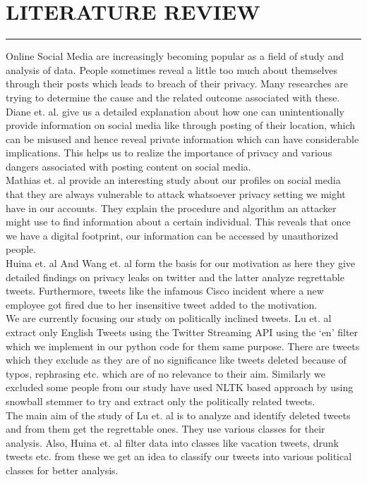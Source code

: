 \documentclass[a4paper,11pt]{article}
\begin{document}
\section{LITERATURE REVIEW}
\hrule
\vspace*{5mm}
Online Social Media are increasingly becoming popular as a field of study and analysis of data. People sometimes reveal a little too much about themselves through their posts which leads to breach of their privacy. Many researches are trying to determine the cause and the related outcome associated with these.
\medskip\\
Diane et. al. \cite{gan2015social} give us a detailed explanation about how one can unintentionally provide information on social media like through posting of their location, which can be misused and hence reveal private information which can have considerable implications. This helps us to realize the importance of privacy and various dangers associated with posting content on social media.
\medskip\\
Mathias et. al \cite{humbert2013nowhere} provide an interesting study about our profiles on social media that they are always vulnerable to attack whatsoever privacy setting we might have in our accounts. They explain the procedure and algorithm an attacker might use to find information about a certain individual. This reveals that once we have a digital footprint, our information can be accessed by unauthorized people. 
\medskip\\
Huina et. al \cite{mao2011loose}  And Wang et. al \cite{wang2011regretted} form the basis for our motivation as here they give detailed findings on privacy leaks on twitter and the latter analyze regrettable tweets. Furthermore, tweets like the infamous Cisco incident where a new employee got fired due to her insensitive tweet added to the motivation.
\medskip\\
We are currently focusing our study on politically inclined tweets. Lu et. al \cite{zhou2016tweet} extract only English Tweets using the Twitter Streaming API using the ‘en’ filter which we implement in our python code for them same purpose. There are tweets which they exclude as they are of no significance like tweets deleted because of typos, rephrasing etc. which are of no relevance to their aim. Similarly we excluded some people from our study have used NLTK based approach by using snowball stemmer to try and extract only the politically related tweets.
\medskip\\
The main aim of the study of Lu et. al \cite{zhou2016tweet} is to analyze and identify deleted tweets and  from them get the regrettable ones. They use various classes for their analysis. Also, Huina et. al \cite{mao2011loose} filter data into classes like vacation tweets, drunk tweets etc. from these we get an idea to classify our tweets into various political classes for better analysis.
\end{document}
